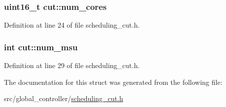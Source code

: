 \hypertarget{structcut_a698d9917bec501d6a3f14cba141b03ae}{
\subsubsection[{num\-\_\-cores}]{\setlength{\rightskip}{0pt plus 5cm}uint16\-\_\-t cut\-::num\-\_\-cores}}\label{structcut_a698d9917bec501d6a3f14cba141b03ae}


Definition at line 24 of file scheduling\-\_\-cut.\-h.

\hypertarget{structcut_ae96cd38e08c0b4514e75210a12ee17ae}{
\subsubsection[{num\-\_\-msu}]{\setlength{\rightskip}{0pt plus 5cm}int cut\-::num\-\_\-msu}}\label{structcut_ae96cd38e08c0b4514e75210a12ee17ae}


Definition at line 29 of file scheduling\-\_\-cut.\-h.



The documentation for this struct was generated from the following file\-:\begin{DoxyCompactItemize}
\item 
src/global\-\_\-controller/\hyperlink{scheduling__cut_8h}{scheduling\-\_\-cut.\-h}\end{DoxyCompactItemize}
